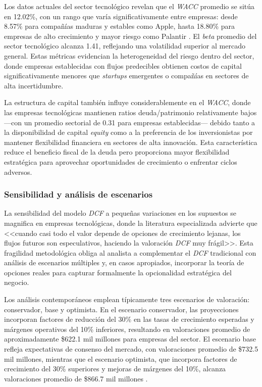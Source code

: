 Los datos actuales del sector tecnológico revelan que el \emph{WACC} promedio se sitúa en 12.02\%, con un rango que varía significativamente entre empresas: desde 8.57\% para compañías maduras y estables como Apple, hasta 18.80\% para empresas de alto crecimiento y mayor riesgo como Palantir \citep{damodaran2024}. El \emph{beta} promedio del sector tecnológico alcanza 1.41, reflejando una volatilidad superior al mercado general. Estas métricas evidencian la heterogeneidad del riesgo dentro del sector, donde empresas establecidas con flujos predecibles obtienen costos de capital significativamente menores que \emph{startups} emergentes o compañías en sectores de alta incertidumbre.

La estructura de capital también influye considerablemente en el \emph{WACC}, donde las empresas tecnológicas mantienen ratios deuda/patrimonio relativamente bajos ---con un promedio sectorial de 0.31 para empresas establecidas--- debido tanto a la disponibilidad de capital \emph{equity} como a la preferencia de los inversionistas por mantener flexibilidad financiera en sectores de alta innovación. Esta característica reduce el beneficio fiscal de la deuda pero proporciona mayor flexibilidad estratégica para aprovechar oportunidades de crecimiento o enfrentar ciclos adversos.

\subsubsection{Sensibilidad y análisis de escenarios}

La sensibilidad del modelo \emph{DCF} a pequeñas variaciones en los supuestos se magnifica en empresas tecnológicas, donde la literatura especializada advierte que <<cuando casi todo el valor depende de opciones de crecimiento lejanas, los flujos futuros son especulativos, haciendo la valoración \emph{DCF} muy frágil>>. Esta fragilidad metodológica obliga al analista a complementar el \emph{DCF} tradicional con análisis de escenarios múltiples y, en casos apropiados, incorporar la teoría de opciones reales para capturar formalmente la opcionalidad estratégica del negocio.

Los análisis contemporáneos emplean típicamente tres escenarios de valoración: conservador, base y optimista. En el escenario conservador, las proyecciones incorporan factores de reducción del 30\% en las tasas de crecimiento esperadas y márgenes operativos del 10\% inferiores, resultando en valoraciones promedio de aproximadamente \$622.1 mil millones para empresas del sector. El escenario base refleja expectativas de consenso del mercado, con valoraciones promedio de \$732.5 mil millones, mientras que el escenario optimista, que incorpora factores de crecimiento del 30\% superiores y mejoras de márgenes del 10\%, alcanza valoraciones promedio de \$866.7 mil millones \citep{dcfanalysis2024}.

